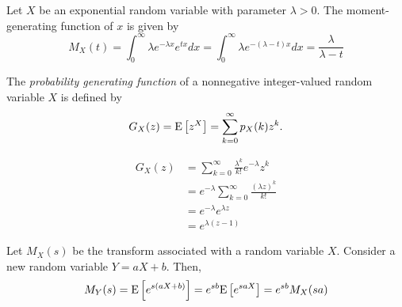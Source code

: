 \begin{example}
Let $X$ be an exponential random variable with parameter $\lambda > 0$.
The moment-generating function of $x$ is given by
\begin{equation*}
M_X (t) = \int_0^{\infty} \lambda e^{-\lambda x} e^{tx} dx
= \int_0^{\infty} \lambda e^{-(\lambda-t) x} dx
= \frac{\lambda}{\lambda - t}
\end{equation*}
\end{example}

The \emph{probability generating function} of a nonnegative integer-valued random variable $X$ is defined by
\begin{equation*}
G_X (z) = \mathrm{E} \left[ z^X \right]
= \sum_{k=0}^{\infty} p_X(k) z^k .
\end{equation*}

\begin{equation*}
\begin{split}
G_X (z) &= \sum_{k=0}^{\infty} \frac{\lambda^k}{k!} e^{-\lambda} z^k \\
&= e^{-\lambda} \sum_{k=0}^{\infty} \frac{(\lambda z)^k}{k!} \\
&= e^{-\lambda} e^{\lambda z} \\
&= e^{\lambda (z-1)}
\end{split}
\end{equation*}



\newpage

\begin{example}
Let $M_X(s)$ be the transform associated with a random variable $X$.
Consider a new random variable $Y = aX + b$.
Then,
\begin{equation*}
M_Y(s) = \mathrm{E} \left[ e^{s(aX + b)} \right]
= e^{sb} \mathrm{E} \left[ e^{saX} \right]
= e^{sb} M_X (sa)
\end{equation*}
\end{example}


